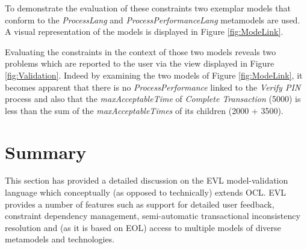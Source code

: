 To demonstrate the evaluation of these constraints two exemplar models that conform to the \emph{ProcessLang} and \emph{ProcessPerformanceLang} metamodels are used. A visual representation of the models is displayed in Figure \ref{fig:ModeLink}.

Evaluating the constraints in the context of those two models reveals two problems which are reported to the user via the view displayed in Figure \ref{fig:Validation}. Indeed by examining the two models of Figure \ref{fig:ModeLink}, it becomes apparent that there is no \emph{ProcessPerformance} linked to the \emph{Verify PIN} process and also that the \emph{maxAcceptableTime} of \emph{Complete Transaction} (5000) is less than the sum of the \emph{maxAcceptableTimes} of its children (2000 + 3500).

\section{Summary}

This section has provided a detailed discussion on the EVL model-validation language which conceptually (as opposed to technically) extends OCL. EVL provides a number of features such as support for detailed user feedback, constraint dependency management, semi-automatic transactional inconsistency resolution and (as it is based on EOL) access to multiple models of diverse metamodels and technologies.


